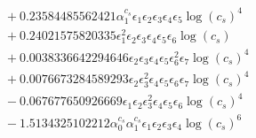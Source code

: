 \documentclass[10pt]{article}
\begin{document}
\begin{align*}
&{}  + 0.23584485562421 \alpha_{1}^{c_s} \epsilon_{1} \epsilon_{2} \epsilon_{3} \epsilon_{4} \epsilon_{5} \log{\left(c_{s} \right)}^{4} \\
&{}  + 0.24021575820335 \epsilon_{1}^{2} \epsilon_{2} \epsilon_{3} \epsilon_{4} \epsilon_{5} \epsilon_{6} \log{\left(c_{s} \right)} \\
&{}  + 0.0038336642294646 \epsilon_{2} \epsilon_{3} \epsilon_{4} \epsilon_{5} \epsilon_{6}^{2} \epsilon_{7} \log{\left(c_{s} \right)}^{4} \\
&{}  + 0.0076673284589293 \epsilon_{2} \epsilon_{3}^{2} \epsilon_{4} \epsilon_{5} \epsilon_{6} \epsilon_{7} \log{\left(c_{s} \right)}^{4} \\
&{}  - 0.067677650926669 \epsilon_{1} \epsilon_{2} \epsilon_{3}^{2} \epsilon_{4} \epsilon_{5} \epsilon_{6} \log{\left(c_{s} \right)}^{4} \\
&{}  - 1.5134325102212 \alpha_{0}^{c_s} \alpha_{1}^{c_s} \epsilon_{1} \epsilon_{2} \epsilon_{3} \epsilon_{4} \log{\left(c_{s} \right)}^{6}
\end{align*}
\end{document}
